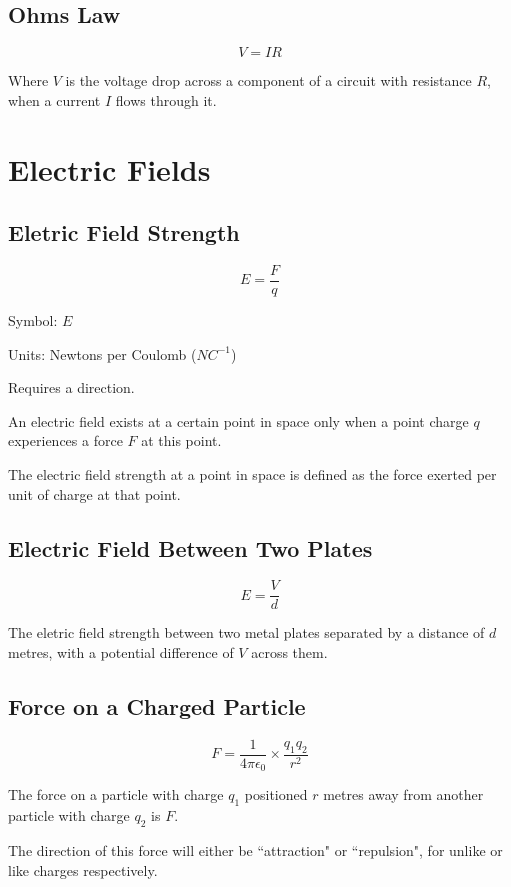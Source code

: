 \documentclass[a4paper,11pt]{article}
\begin{document}
\subsection{Ohms Law}

$$
V = IR
$$

Where $V$ is the voltage drop across a component of a circuit with resistance
$R$, when a current $I$ flows through it.




\section{Electric Fields}

\subsection{Eletric Field Strength}

$$
E = \frac{F}{q}
$$

Symbol: $E$

Units: Newtons per Coulomb ($NC^{-1}$)

Requires a direction.

An electric field exists at a certain point in space only when a point charge
$q$ experiences a force $F$ at this point.

The electric field strength at a point in space is defined as the force exerted
per unit of charge at that point.


\subsection{Electric Field Between Two Plates}

$$
E = \frac{V}{d}
$$

The eletric field strength between two metal plates separated by a distance of
$d$ metres, with a potential difference of $V$ across them.


\subsection{Force on a Charged Particle}

$$
F = \frac{1}{4 \pi \epsilon_0} \times \frac{q_1 q_2}{r^2}
$$

The force on a particle with charge $q_1$ positioned $r$ metres away from
another particle with charge $q_2$ is $F$.

The direction of this force will either be ``attraction" or ``repulsion", for
unlike or like charges respectively.
\end{document}
